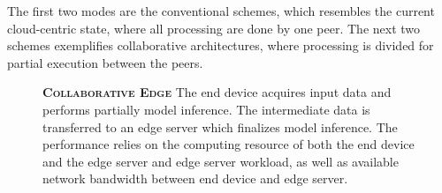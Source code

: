 The first two modes are the conventional schemes, which resembles the current cloud-centric state, where all processing are done by one peer. The next two schemes exemplifies collaborative architectures, where processing is divided for partial execution between the peers.

\begin{figure}
	\begin{minipage}{0.65\linewidth}
		\textbf{\protect{} \textsc{Collaborative Edge}}
		\color{caption-color} \newline
		The end device acquires input data and performs partially model inference. The intermediate data is transferred to an edge server which finalizes model inference. The performance relies on the computing resource of both the end device and the edge server and edge server workload, as well as available network bandwidth between end device and edge server. 
	\end{minipage}%
	\hfill
	\begin{minipage}{0.3\linewidth}
		\centering
		\captionsetup[subfigure]{justification=centering}
		\begin{figure}
			\centering

\end{figure}
\end{minipage}
\end{figure}
